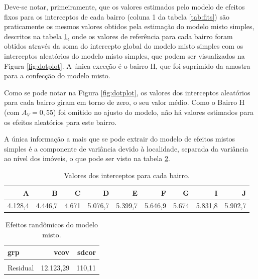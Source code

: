 \documentclass[
  a4paper, 11pt]{article}
\begin{document}
Deve-se notar, primeiramente, que os valores estimados pelo modelo de
efeitos fixos para os interceptos de cada bairro (coluna 1 da tabela
\ref{tab:fits}) são praticamente os mesmos valores obtidos pela
estimação do modelo misto simples, descritos na tabela
\ref{tab:somaitcpt}, onde os valores de referência para cada bairro
foram obtidos através da soma do intercepto global do modelo misto
simples com os interceptos aleatórios do modelo misto simples, que podem
ser visualizados na Figura \ref{fig:dotplot}. A única exceção é o bairro
H, que foi suprimido da amostra para a confecção do modelo misto.

Como se pode notar na Figura \ref{fig:dotplot}, os valores dos
interceptos aleatórios para cada bairro giram em torno de zero, o seu
valor médio. Como o Bairro H (com \(A_V = 0,55\)) foi omitido no ajusto
do modelo, não há valores estimados para os efeitos aleatórios para este
bairro.

A única informação a mais que se pode extrair do modelo de efeitos
mistos simples é a componente de variância devido à localidade, separada
da variância ao nível dos imóveis, o que pode ser visto na tabela
\ref{tab:variancias}.

\begin{table}[H]

\caption{\label{tab:somaitcpt}Valores dos interceptos para cada bairro.}
\centering
\fontsize{10}{12}\selectfont
\begin{tabular}[t]{rrrrrrrrr}
\toprule
A & B & C & D & E & F & G & I & J\\
\midrule
4.128,4 & 4.446,7 & 4.671 & 5.076,7 & 5.399,7 & 5.646,9 & 5.674 & 5.831,8 & 5.902,7\\
\bottomrule
\end{tabular}
\end{table}

\begin{table}[H]

\caption{\label{tab:variancias}Efeitos randômicos do modelo misto.}
\centering
\begin{tabular}[t]{lrr}
\toprule
grp & vcov & sdcor\\
\midrule
\cellcolor{gray!6}{Bairro} & \cellcolor{gray!6}{421.256,03} & \cellcolor{gray!6}{649,04}\\
Residual & 12.123,29 & 110,11\\
\bottomrule
\end{tabular}
\end{table}
\end{document}
